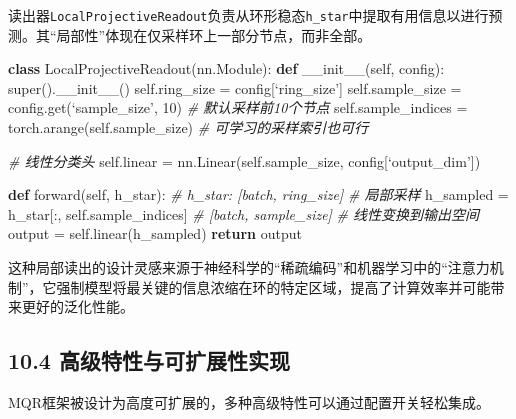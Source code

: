 \documentclass[
  12pt,
]{article}
\newenvironment{Shaded}{}{}
\newcommand{\BuiltInTok}[1]{#1}
\newcommand{\CommentTok}[1]{\textcolor[rgb]{0.38,0.63,0.69}{\textit{#1}}}
\newcommand{\ControlFlowTok}[1]{\textcolor[rgb]{0.00,0.44,0.13}{\textbf{#1}}}
\newcommand{\DecValTok}[1]{\textcolor[rgb]{0.25,0.63,0.44}{#1}}
\newcommand{\FunctionTok}[1]{\textcolor[rgb]{0.02,0.16,0.49}{#1}}
\newcommand{\KeywordTok}[1]{\textcolor[rgb]{0.00,0.44,0.13}{\textbf{#1}}}
\newcommand{\NormalTok}[1]{#1}
\newcommand{\OperatorTok}[1]{\textcolor[rgb]{0.40,0.40,0.40}{#1}}
\newcommand{\VariableTok}[1]{\textcolor[rgb]{0.10,0.09,0.49}{#1}}
\begin{document}
读出器\texttt{LocalProjectiveReadout}负责从环形稳态\texttt{h\_star}中提取有用信息以进行预测。其``局部性''体现在仅采样环上一部分节点，而非全部。

\begin{Shaded}
\begin{Highlighting}[]
\KeywordTok{class}\NormalTok{ LocalProjectiveReadout(nn.Module):}
    \KeywordTok{def} \FunctionTok{\_\_init\_\_}\NormalTok{(}\VariableTok{self}\NormalTok{, config):}
        \BuiltInTok{super}\NormalTok{().}\FunctionTok{\_\_init\_\_}\NormalTok{()}
        \VariableTok{self}\NormalTok{.ring\_size }\OperatorTok{=}\NormalTok{ config[‘ring\_size’]}
        \VariableTok{self}\NormalTok{.sample\_size }\OperatorTok{=}\NormalTok{ config.get(‘sample\_size’, }\DecValTok{10}\NormalTok{)  }\CommentTok{\# 默认采样前10个节点}
        \VariableTok{self}\NormalTok{.sample\_indices }\OperatorTok{=}\NormalTok{ torch.arange(}\VariableTok{self}\NormalTok{.sample\_size)  }\CommentTok{\# 可学习的采样索引也可行}
        
        \CommentTok{\# 线性分类头}
        \VariableTok{self}\NormalTok{.linear }\OperatorTok{=}\NormalTok{ nn.Linear(}\VariableTok{self}\NormalTok{.sample\_size, config[‘output\_dim’])}
        
    \KeywordTok{def}\NormalTok{ forward(}\VariableTok{self}\NormalTok{, h\_star):}
        \CommentTok{\# h\_star: [batch, ring\_size]}
        \CommentTok{\# 局部采样}
\NormalTok{        h\_sampled }\OperatorTok{=}\NormalTok{ h\_star[:, }\VariableTok{self}\NormalTok{.sample\_indices]  }\CommentTok{\# [batch, sample\_size]}
        \CommentTok{\# 线性变换到输出空间}
\NormalTok{        output }\OperatorTok{=} \VariableTok{self}\NormalTok{.linear(h\_sampled)}
        \ControlFlowTok{return}\NormalTok{ output}
\end{Highlighting}
\end{Shaded}

这种局部读出的设计灵感来源于神经科学的``稀疏编码''和机器学习中的``注意力机制''，它强制模型将最关键的信息浓缩在环的特定区域，提高了计算效率并可能带来更好的泛化性能。

\hypertarget{ux9ad8ux7ea7ux7279ux6027ux4e0eux53efux6269ux5c55ux6027ux5b9eux73b0}{%
\subsection{10.4
高级特性与可扩展性实现}\label{ux9ad8ux7ea7ux7279ux6027ux4e0eux53efux6269ux5c55ux6027ux5b9eux73b0}}

MQR框架被设计为高度可扩展的，多种高级特性可以通过配置开关轻松集成。
\end{document}
